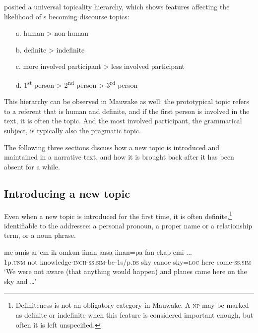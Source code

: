 \citet[152]{Givon1976} posited a universal topicality hierarchy, which shows features affecting the likelihood of s becoming discourse topics: 

\begin{enumerate}
 \item [a.]  human {{\textgreater}} non-human
 \item [b.]  definite {{\textgreater}} indefinite
 \item [c.]  more involved participant {{\textgreater}} less involved participant
 \item [d.]  1\textsuperscript{st} person {{\textgreater}} 2\textsuperscript{nd} person {{\textgreater}} 3\textsuperscript{rd} person
\end{enumerate}






This hierarchy can be observed in Mauwake as well: the prototypical topic refers to a referent that is human and definite, and if the first person is involved in the text, it is often the topic. And the most involved participant, the grammatical subject, is typically also the pragmatic topic. 

The following three sections discuss how a new topic is introduced and maintained in a narrative text, and how it is brought back after it has been absent for a while. 

\subsection{Introducing a new topic}

Even when a new topic is introduced for the first time, it is often definite,\footnote{Definiteness is not an obligatory category in Mauwake. A \textsc{np} may be marked as definite or indefinite when this  feature is considered important enough, but often it is left unspecified.} identifiable to the addressee: a personal pronoun, a proper name or a relationship term, or a noun phrase. 

\ea%
\label{ex:x1663}
\gll {}  me  amis-ar-em-ik-omkun  iinan  aasa iinan=pa  fan  ekap-emi  ... \\
1p.\textsc{unm}  not  knowledge-\textsc{inch}-\textsc{ss}.\textsc{sim}-be-1s/p.\textsc{ds}  sky  canoe sky=\textsc{loc}  here  come-\textsc{ss}.\textsc{sim} \\
\glt`We were not aware (that anything would happen) and planes came here on the sky and {\dots}'
\z


